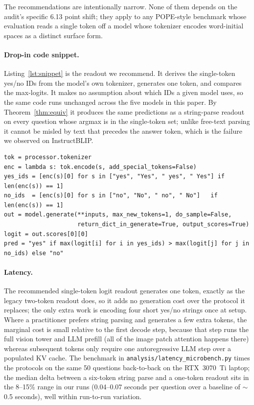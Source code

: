 \documentclass[11pt,letterpaper]{article}
\begin{document}
The recommendations are intentionally narrow. None of them depends on
the audit's specific 6.13 point shift; they apply to any POPE-style
benchmark whose evaluation reads a single token off a model whose
tokenizer encodes word-initial spaces as a distinct surface form.

\paragraph{Drop-in code snippet.} Listing~\ref{lst:snippet} is the
readout we recommend. It derives the single-token yes/no IDs from the
model's own tokenizer, generates one token, and compares the
max-logits. It makes no assumption about which IDs a given model uses,
so the same code runs unchanged across the five models in this paper.
By Theorem~\ref{thm:equiv} it produces the same predictions as a
string-parse readout on every question whose argmax is in the
single-token set; unlike free-text parsing it cannot be misled by text
that precedes the answer token, which is the failure we observed on
InstructBLIP.

\begin{lstlisting}[caption={Drop-in POPE answer readout. Derive the
yes/no token IDs from the model's own tokenizer, then compare
first-token max-logits. Runs unchanged across tokenizer families.},
label={lst:snippet}]
tok = processor.tokenizer
enc = lambda s: tok.encode(s, add_special_tokens=False)
yes_ids = [enc(s)[0] for s in ["yes", "Yes", " yes", " Yes"] if len(enc(s)) == 1]
no_ids  = [enc(s)[0] for s in ["no", "No", " no", " No"]   if len(enc(s)) == 1]
out = model.generate(**inputs, max_new_tokens=1, do_sample=False,
                     return_dict_in_generate=True, output_scores=True)
logit = out.scores[0][0]
pred = "yes" if max(logit[i] for i in yes_ids) > max(logit[j] for j in no_ids) else "no"
\end{lstlisting}

\paragraph{Latency.} The recommended single-token logit readout
generates one token, exactly as the legacy two-token readout does, so
it adds no generation cost over the protocol it replaces; the only
extra work is encoding four short yes/no strings once at setup. Where a
practitioner prefers string parsing and generates a few extra tokens,
the marginal cost is small relative to the first decode step, because
that step runs the full vision tower and LLM prefill (all of the image
patch attention happens there) whereas subsequent tokens only require
one autoregressive LLM step over a populated KV cache. The benchmark in
\texttt{analysis/latency\_microbench.py} times the protocols on the same
50 questions back-to-back on the RTX~3070~Ti laptop; the median delta
between a six-token string parse and a one-token readout sits in the
8--15\% range in our runs (0.04--0.07 seconds per question over a
baseline of $\sim$0.5 seconds), well within run-to-run variation.
\end{document}
